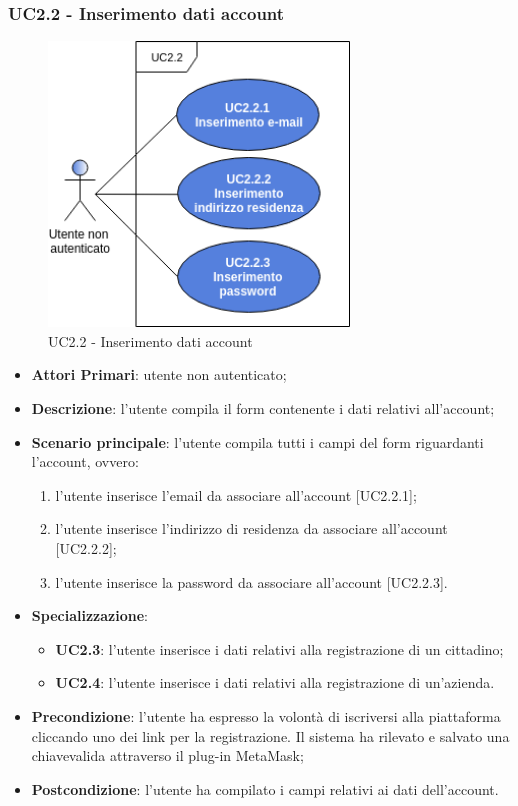 \subsubsection{UC2.2 - Inserimento dati account}
\begin{figure}[h]
	\includegraphics[width=8cm]{res/images/UC2-2RegistrazioneGenerale.png}
	\centering
	\caption{UC2.2 - Inserimento dati account}
\end{figure}
\begin{itemize}
	\item \textbf{Attori Primari}: utente non autenticato;
	\item \textbf{Descrizione}: l'utente compila il form contenente i dati relativi all'account;
	\item \textbf{Scenario principale}: l'utente compila tutti i campi del form riguardanti l'account, ovvero:
	\begin{enumerate}[label=\alph*.]
		\item l'utente inserisce l'email da associare all'account [UC2.2.1];
		\item l'utente inserisce l'indirizzo di residenza da associare all'account [UC2.2.2];
		\item l'utente inserisce la password da associare all'account [UC2.2.3].
	\end{enumerate}
	\item \textbf{Specializzazione}:
	\begin{itemize}
		\item \textbf{UC2.3}: l'utente inserisce i dati relativi alla registrazione di un cittadino;
		\item \textbf{UC2.4}: l'utente inserisce i dati relativi alla registrazione di un'azienda.
		
	\end{itemize}
	\item \textbf{Precondizione}: l'utente ha espresso la volontà di iscriversi alla piattaforma cliccando uno dei link per la registrazione. Il sistema ha rilevato e salvato una chiave\glosp valida attraverso il plug-in MetaMask\glosp;
	\item \textbf{Postcondizione}: l'utente ha compilato i campi relativi ai dati dell'account.
	
\end{itemize}
